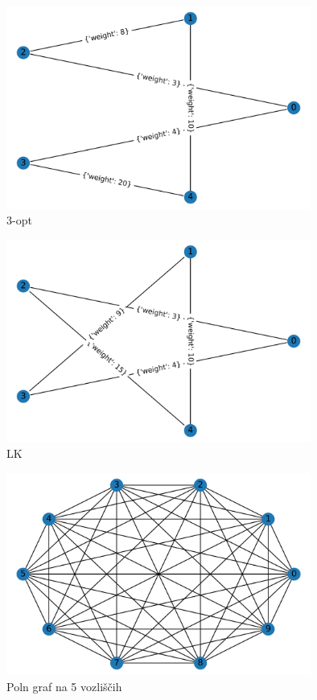 \documentclass[8pt]{beamer}
\begin{document}
\begin{frame}
  \begin{figure}
  \includegraphics[width=10cm]{primeri/primer1_3opt.png}
 	\caption{3-opt}
	\label{Slika 3}
	\end{figure}
\end{frame}

\begin{frame}
\begin{figure}
  \includegraphics[width=10cm]{primeri/primer1_lk.png}
\caption{LK}
\label{Slika 4}
\end{figure}
\end{frame}

\begin{frame}
  \begin{figure}
  \includegraphics[width=10cm]{primeri/primer2.png}
 	\caption{Poln graf na 5 vozliščih}
	\label{Slika 5}
	\end{figure}
\end{frame}
\end{document}
